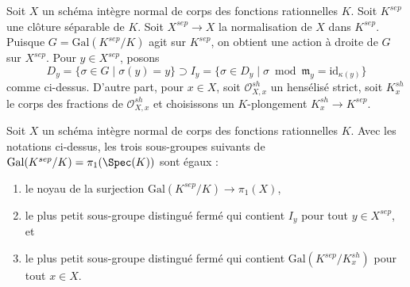 \noindent
Soit $X$ un schéma intègre normal de corps des fonctions rationnelles $K$.
Soit $K^{sep}$ une clôture séparable de $K$.
Soit $X^{sep} \to X$ la normalisation de $X$ dans $K^{sep}$.
Puisque $G = \text{Gal}(K^{sep}/K)$ agit sur $K^{sep}$,
on obtient une action à droite de $G$ sur $X^{sep}$.
Pour $y \in X^{sep}$, posons
$$
D_y = \{\sigma \in G \mid \sigma(y) = y\} \supset
I_y = \{\sigma \in D_y \mid \sigma \bmod \mathfrak m_y =
\text{id}_{\kappa(y)} \}
$$
comme ci-dessus. D'autre part, pour $x \in X$,
soit $\mathcal{O}_{X, x}^{sh}$ un hensélisé strict,
soit $K_x^{sh}$ le corps des fractions de $\mathcal{O}_{X, x}^{sh}$
et choisissons un $K$-plongement $K_x^{sh} \to K^{sep}$.

\begin{lemma}
\label{lemma-normal-pione-quotient-inertia}
Soit $X$ un schéma intègre normal de corps des fonctions rationnelles $K$.
Avec les notations ci-dessus, les trois sous-groupes suivants de
$\text{Gal}(K^{sep}/K) = \pi_1(\Spec(K))$
sont égaux :
\begin{enumerate}
\item le noyau de la surjection
$\text{Gal}(K^{sep}/K) \longrightarrow \pi_1(X)$,
\item le plus petit sous-groupe distingué fermé qui contient $I_y$
pour tout $y \in X^{sep}$, et
\item le plus petit sous-groupe distingué fermé qui contient
$\text{Gal}(K^{sep}/K_x^{sh})$ pour tout $x \in  X$.
\end{enumerate}
\end{lemma}

